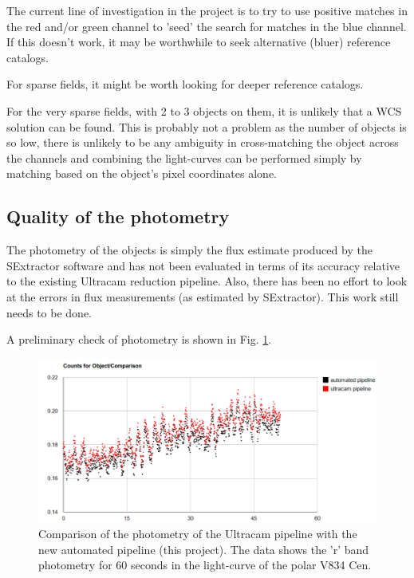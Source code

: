 The current line of investigation in the project is to try to use positive matches in the red and/or green channel to 'seed' the search for matches in the blue channel. If this doesn't work, it may be worthwhile to seek alternative (bluer) reference catalogs. 

For sparse fields, it might be worth looking for deeper reference catalogs. 

For the very sparse fields, with 2 to 3 objects on them, it is unlikely that a WCS solution can be found. This is probably not a problem as the number of objects is so low, there is unlikely to be any ambiguity in cross-matching the object across the channels and combining the light-curves can be performed simply by matching based on the object's pixel coordinates alone.  


\subsection{Quality of the photometry}
The photometry of the objects is simply the flux estimate produced by the SExtractor software and has not been evaluated in terms of its accuracy relative to the existing Ultracam reduction pipeline. Also, there has been no effort to look at the errors in flux measurements (as estimated by SExtractor). This work still needs to be done. 

A preliminary check of photometry is shown in Fig. \ref{fig:V834Cen}. 

\begin{figure}[!h]
	\centering
	\includegraphics[width=120mm]{images/V834Cen.png}
	\caption{Comparison of the photometry of the Ultracam pipeline with the new automated pipeline (this project). The data shows the 'r' band photometry for 60 seconds in the light-curve of the polar V834 Cen.}
	\label{fig:V834Cen}
\end{figure}

